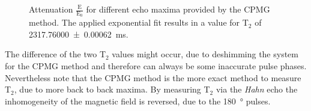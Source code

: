 \begin{figure}[H]
    \centering
    
    \caption[Attenuation $\frac{\text{E}}{\text{E}_0}$ for different echo maxima provided by the CPMG method.]{Attenuation $\frac{\text{E}}{\text{E}_0}$ for different echo maxima provided by the CPMG method. The applied exponential fit results in a value for T$_2$ of \SI{2317.76000 \pm 0.00062}{\milli \second}.}
    \label{fig:CPMG}
\end{figure}

The difference of the two T$_2$ values might occur, due to deshimming the system for the CPMG method and therefore can always be some inaccurate pulse phases. Nevertheless note that the CPMG method is the more exact method to measure T$_2$, due to more back to back maxima. By measuring T$_2$ via the \textit{Hahn} echo the inhomogeneity of the magnetic field is reversed, due to the \SI{180}{\degree} pulses.